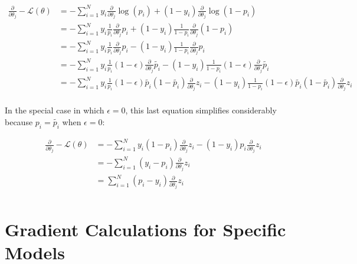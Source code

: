 \documentclass[12pt]{article}
\begin{document}
\begin{equation*}
\begin{split}
\frac{\partial}{\partial \theta_j} -\mathcal{L}(\theta)
  &= -\sum_{i = 1}^{N}
    y_i \frac{\partial}{\partial \theta_j} \log(p_i)
    + (1 - y_i) \frac{\partial}{\partial \theta_j} \log(1 - p_i) \\
  &= -\sum_{i = 1}^{N}
    y_i \frac{1}{p_i} \frac{\partial}{\partial \theta_j} p_i
    + (1 - y_i) \frac{1}{1 - p_i} \frac{\partial}{\partial \theta_j} (1 - p_i) \\
  &= -\sum_{i = 1}^{N}
    y_i \frac{1}{p_i} \frac{\partial}{\partial \theta_j} p_i
    - (1 - y_i) \frac{1}{1 - p_i} \frac{\partial}{\partial \theta_j} p_i \\
  &= -\sum_{i = 1}^{N}
    y_i \frac{1}{p_i} (1 - \epsilon) \frac{\partial}{\partial \theta_j} \tilde{p_i}
    - (1 - y_i) \frac{1}{1 - p_i} (1 - \epsilon) \frac{\partial}{\partial \theta_j} \tilde{p_i} \\
  &= -\sum_{i = 1}^{N}
    y_i \frac{1}{p_i} (1 - \epsilon) \tilde{p_i} (1 - \tilde{p_i}) \frac{\partial}{\partial \theta_j} z_i
    - (1 - y_i) \frac{1}{1 - p_i} (1 - \epsilon) \tilde{p_i} (1 - \tilde{p_i}) \frac{\partial}{\partial \theta_j} z_i \\
\end{split}
\end{equation*}

In the special case in which $\epsilon = 0$, this last equation simplifies
considerably because $p_i = \tilde{p_i}$ when $\epsilon = 0$:

\begin{equation*}
\begin{split}
\frac{\partial}{\partial \theta_j} - \mathcal{L}(\theta)
  &= -\sum_{i = 1}^{N} y_i (1 - p_i) \frac{\partial}{\partial \theta_j} z_i
    - (1 - y_i) p_i \frac{\partial}{\partial \theta_j} z_i \\
  &= -\sum_{i = 1}^{N} (y_i - p_i) \frac{\partial}{\partial \theta_j} z_i \\
  &= \sum_{i = 1}^{N} (p_i - y_i) \frac{\partial}{\partial \theta_j} z_i \\
\end{split}
\end{equation*}

\section{Gradient Calculations for Specific Models}
\end{document}
